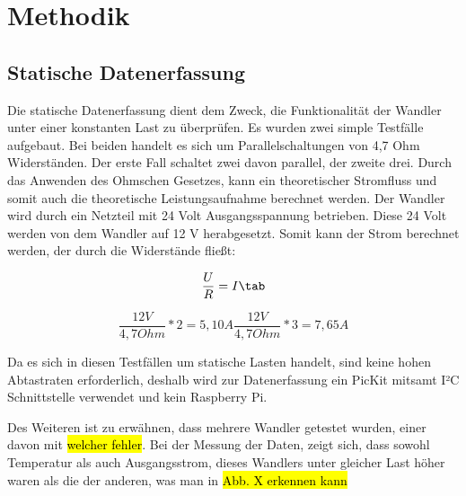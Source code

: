\section{Methodik}
\subsection{Statische Datenerfassung}

\begin{flushleft}
Die statische Datenerfassung dient dem Zweck, die Funktionalität der Wandler unter einer konstanten Last zu überprüfen. Es wurden zwei simple Testfälle aufgebaut. Bei beiden handelt es sich um Parallelschaltungen von 4,7 Ohm Widerständen. Der erste Fall schaltet zwei davon parallel, der zweite drei. Durch das Anwenden des Ohmschen Gesetzes, kann ein theoretischer Stromfluss und somit auch die theoretische Leistungsaufnahme berechnet werden. Der Wandler wird durch ein Netzteil mit 24 Volt Ausgangsspannung betrieben. Diese 24 Volt werden von dem Wandler auf 12 V herabgesetzt. 
Somit kann der Strom berechnet werden, der durch die Widerstände fließt:
\end{flushleft}


\begin{equation}
\label{Ohmsches Gesetz}
\frac{U}{R} = I \tab
\end{equation}


\begin{equation}
\label{Ohmsches Gesetz}
\frac{12V}{4,7 Ohm}*2 = 5,10 A 
\frac{12V}{4,7 Ohm}*3 = 7,65 A
\end{equation}

\begin{flushleft}
Da es sich in diesen Testfällen um statische Lasten handelt, sind keine hohen Abtastraten erforderlich, deshalb wird zur Datenerfassung ein PicKit mitsamt I²C Schnittstelle verwendet und kein Raspberry Pi. 

Des Weiteren ist zu erwähnen, dass mehrere Wandler getestet wurden, einer davon mit \hl{welcher fehler}. Bei der Messung der Daten, zeigt sich, dass sowohl Temperatur als auch Ausgangsstrom, dieses Wandlers unter gleicher Last höher waren als die der anderen, was man in \hl{Abb. X erkennen kann} 
\end{flushleft}

